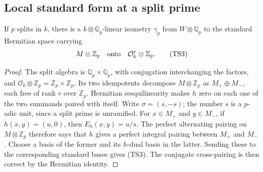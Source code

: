 \subsection{Local standard form at a split prime}

\begin{lemma}\label{ts-local-isometry}
If $p$ splits in $k$, there is a $k\otimes\mathbb Q_p$-linear
isometry $\gamma_p$ from $W\otimes\mathbb Q_p$ to the
standard Hermitian space carrying
\[
                     M\otimes\mathbb Z_p
                      \quad\hbox{onto}\quad
                     \mathcal O_k^r\otimes\mathbb Z_p.
 \tag{TS3}
\]
\end{lemma}
\begin{proof}
The split algebra is $\mathbb Q_p\times\mathbb Q_p$,
with conjugation interchanging the factors, and
$\mathcal O_k\otimes\mathbb Z_p=\mathbb Z_p\times\mathbb Z_p$.
Its two idempotents decompose $M\otimes\mathbb Z_p$
as $M_+\oplus M_-$, each free of rank $r$ over
$\mathbb Z_p$.
Hermitian sesquilinearity makes $h$ zero on each one
of the two summands paired with itself.
Write $\sigma=(s,-s)$; the number $s$ is a $p$-adic unit,
since a split prime is unramified.
For $x\in M_+$ and $y\in M_-$, if $h(x,y)=(u,0)$,
then $E_h(x,y)=u/s$.
The perfect alternating pairing on $M\otimes\mathbb Z_p$
therefore says that $h$ gives a perfect integral pairing
between $M_+$ and $M_-$.
Choose a basis of the former and its $h$-dual basis in
the latter.  Sending these to the corresponding standard
bases gives (TS3).  The conjugate cross-pairing is then
correct by the Hermitian identity.
\end{proof}

